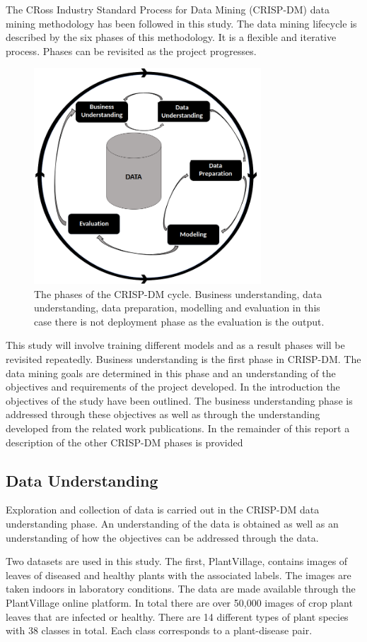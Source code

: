 \documentclass[conference]{IEEEtran}
\begin{document}
The CRoss Industry Standard Process for Data Mining (CRISP-DM) data mining methodology has been followed in this study. The data mining lifecycle is described by the six phases of this methodology. It is a flexible and iterative process. Phases can be revisited as the project progresses.
\begin{figure}[htbp]
\centerline{\includegraphics[width=8.5cm]{CRISP_DM_no deployment.png}}
\caption{    The phases of the CRISP-DM cycle. Business understanding, data understanding, data preparation, modelling and evaluation in this case there is not deployment phase as the evaluation is the output.}
\label{fig}
\end{figure}
This study will involve training different models and as a result phases will be revisited repeatedly. Business understanding is the first phase in CRISP-DM. The data mining goals are determined in this phase and an understanding of the objectives and requirements of the project developed. In the introduction the objectives of the study have been outlined. The business understanding phase is addressed through these objectives as well as through the understanding developed from the related work publications. In the remainder of this report a description of the other CRISP-DM phases is provided


\subsection{Data Understanding}\label{AA}
Exploration and collection of data is carried out in the CRISP-DM data understanding phase. An understanding of the data is obtained as well as an understanding of how the objectives can be addressed through the data. 

Two datasets are used in this study. The first, PlantVillage\cite{kaggledatasetPlantville}, contains images of leaves of diseased and healthy plants with the associated labels. The images are taken indoors in laboratory conditions. The data are made available through the PlantVillage online platform. In total there are over 50,000 images of crop plant leaves that are infected or healthy. There are 14 different types of plant species with 38 classes in total. Each class corresponds to a plant-disease pair. 
\end{document}
